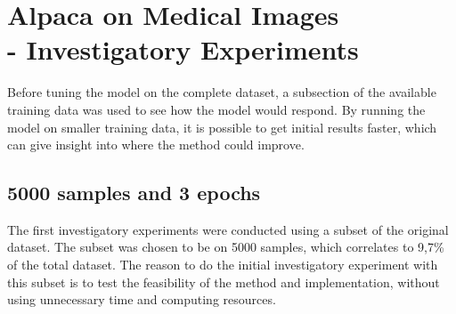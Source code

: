 \label{4_investigatory_experiments}

\section{Alpaca on Medical Images\\- Investigatory Experiments}

Before tuning the model on the complete dataset, a subsection of the available training data was used to see how the model would respond. By running the model on smaller training data, it is possible to get initial results faster, which can give insight into where the method could improve. 

    \subsection{5000 samples and 3 epochs}

    The first investigatory experiments were conducted using a subset of the original dataset. The subset was chosen to be on 5000 samples, which correlates to 9,7\% of the total dataset. The reason to do the initial investigatory experiment with this subset is to test the feasibility of the method and implementation, without using unnecessary time and computing resources. 


